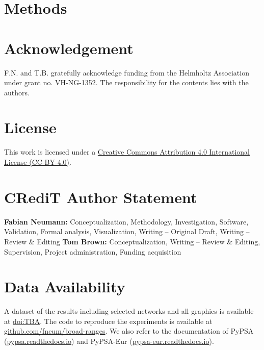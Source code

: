 \documentclass[1p,11pt]{elsarticle}
\newcommand{\usection}[2]{
	\section*{#1}
	\label{#2}
	\addcontentsline{toc}{section}{\nameref{#2}}
}
\begin{document}
\usection{Methods}{sec:methods}



\section*{Acknowledgement}

F.N. and T.B. gratefully acknowledge funding from the Helmholtz Association
under grant no. VH-NG-1352. The responsibility for the contents lies with the
authors.

\section*{License}

This work is licensed under a \href{http://creativecommons.org/licenses/by/4.0/}{Creative Commons Attribution 4.0
International License (CC-BY-4.0)}.

\section*{CRediT Author Statement}

\textbf{Fabian Neumann:} Conceptualization, Methodology, Investigation, Software, Validation, Formal analysis, Visualization, Writing -- Original Draft, Writing -- Review \& Editing
\textbf{Tom Brown:} Conceptualization, Writing -- Review \& Editing, Supervision, Project administration, Funding acquisition

\section*{Data Availability}

A dataset of the results including selected networks and all graphics is available at \href{TBA}{doi:TBA}.
The code to reproduce the experiments is available at \href{https://github.com/fneum/broad-ranges}{github.com/fneum/broad-ranges}.
We also refer to the documentation of PyPSA (\href{https://pypsa.readthedocs.io}{pypsa.readthedocs.io}) and
PyPSA-Eur (\href{https://pypsa-eur.readthedocs.io}{pypsa-eur.readthedocs.io}).

\renewcommand{\ttdefault}{\sfdefault}


\newpage
\tableofcontents

% 	
\end{document}
